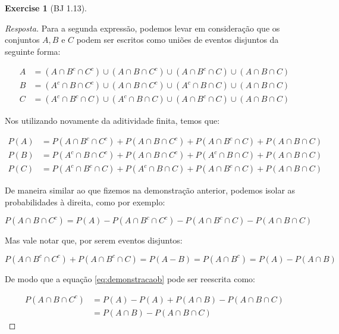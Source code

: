 \documentclass[
]{article}
\theoremstyle{definition}
\theoremstyle{definition}
\theoremstyle{definition}
\newtheorem{exercise}{Exercise}[section]
\theoremstyle{definition}
\theoremstyle{remark}
\begin{document}
\begin{exercise}[BJ 1.13]
\begin{proof}[Resposta]
Para a segunda expressão, podemos levar em consideração que os conjuntos \(A,B \text{ e } C\) podem ser escritos como uniões de eventos disjuntos da seguinte forma:

\begin{align*}
A &= (A \cap B^{c} \cap C^{c}) \cup (A \cap B \cap C^{c}) \cup (A \cap B^{c} \cap C) \cup (A \cap B \cap C) \\
B &= (A^{c} \cap B \cap C^{c}) \cup (A \cap B \cap C^{c}) \cup (A^{c} \cap B \cap C) \cup (A \cap B \cap C) \\
C &= (A^{c} \cap B^{c} \cap C) \cup (A^{c} \cap B \cap C) \cup (A \cap B^{c} \cap C) \cup (A \cap B \cap C)
\end{align*}

Nos utilizando novamente da aditividade finita, temos que:

\begin{align*}
P(A) &= P(A \cap B^{c} \cap C^{c}) + P(A \cap B \cap C^{c}) + P(A \cap B^{c} \cap C) + P(A \cap B \cap C) \\
P(B) &= P(A^{c} \cap B \cap C^{c}) + P(A \cap B \cap C^{c}) + P(A^{c} \cap B \cap C) + P(A \cap B \cap C) \\
P(C) &= P(A^{c} \cap B^{c} \cap C) + P(A^{c} \cap B \cap C) + P(A \cap B^{c} \cap C) + P(A \cap B \cap C)
\end{align*}

De maneira similar ao que fizemos na demonstração anterior, podemos isolar as probabilidades à direita, como por exemplo:

\begin{equation}
P(A \cap B \cap C^{c}) = P(A) - P(A \cap B^{c} \cap C^{c}) - P(A \cap B^{c} \cap C) - P(A \cap B \cap C)
\label{eq:demonstracaob}
\end{equation}

Mas vale notar que, por serem eventos disjuntos:

\begin{equation*}
P(A \cap B^{c} \cap C^{c}) + P(A \cap B^{c} \cap C) = P(A - B) = P(A \cap B^{c}) = P(A) - P(A \cap B)
\end{equation*}

De modo que a equação \eqref{eq:demonstracaob} pode ser reescrita como:

\begin{align*}
P(A \cap B \cap C^{c}) &= P(A) - P(A) + P(A \cap B) - P(A \cap B \cap C) \\
&= P(A \cap B) - P(A \cap B \cap C)
\end{align*}


\end{proof}
\end{exercise}
\end{document}
